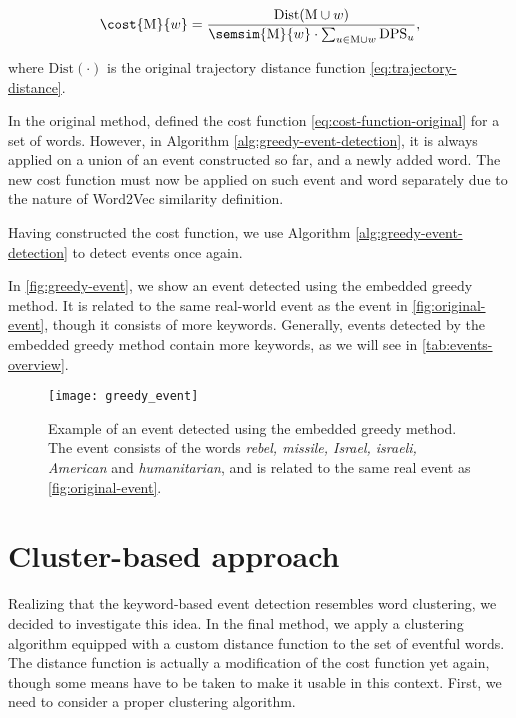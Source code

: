 \begin{equation} \label{eq:cost-function}
	\cost{\featset}{w} = \frac{\text{Dist}( \featset \cup w )}{\semsim{\featset}{w} \cdot \sum_{u \in \featset \cup w}{\text{DPS}_{u}}},
\end{equation}

where $\text{Dist}(\cdot)$ is the original trajectory distance function \eqref{eq:trajectory-distance}.

In the original method, \cite{event-detection} defined the cost function \eqref{eq:cost-function-original} for a set of words. However, in Algorithm \ref{alg:greedy-event-detection}, it is always applied on a union of an event constructed so far, and a newly added word. The new cost function must now be applied on such event and word separately due to the nature of Word2Vec similarity definition.

Having constructed the cost function, we use Algorithm \ref{alg:greedy-event-detection} to detect events once again.

In \autoref{fig:greedy-event}, we show an event detected using the embedded greedy method. It is related to the same real-world event as the event in \autoref{fig:original-event}, though it consists of more keywords. Generally, events detected by the embedded greedy method contain more keywords, as we will see in \autoref{tab:events-overview}.

\begin{figure}
  \centering
  \texttt{[image: greedy\_event]}  %
  \caption{Example of an event detected using the embedded greedy method. The event consists of the words \textit{rebel, missile, Israel, israeli, American} and \textit{humanitarian}, and is related to the same real event as \autoref{fig:original-event}.}
  \label{fig:greedy-event}
\end{figure}


\section{Cluster-based approach}
Realizing that the keyword-based event detection resembles word clustering, we decided to investigate this idea. In the final method, we apply a clustering algorithm equipped with a custom distance function to the set of eventful words. The distance function is actually a modification of the cost function yet again, though some means have to be taken to make it usable in this context. First, we need to consider a proper clustering algorithm.

